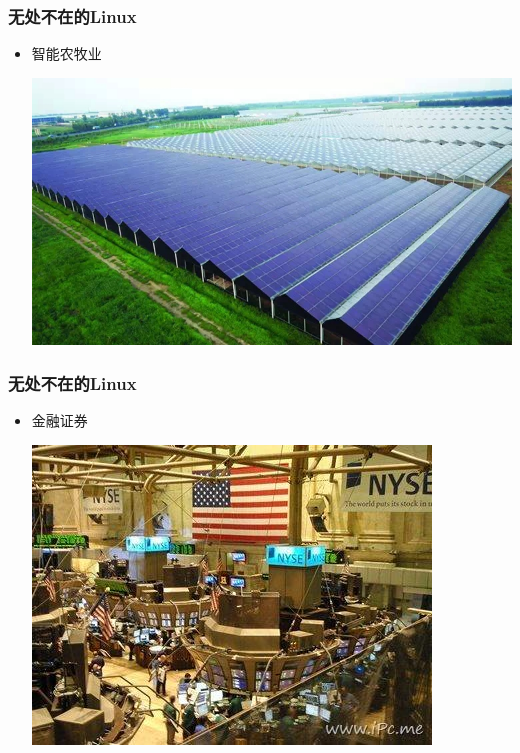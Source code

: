 \documentclass[xcolor=svgnames,bigger,presentation]{beamer}
\begin{document}
\begin{frame}
\frametitle{无处不在的Linux}
\label{sec-2-4-7}
\begin{itemize}

\item 智能农牧业
\label{sec-2-4-7-1}%
\begin{center}
\includegraphics[width=.9\linewidth]{img/nongye.jpg}
\end{center}

\end{itemize} %
\end{frame}
\begin{frame}
\frametitle{无处不在的Linux}
\label{sec-2-4-8}
\begin{itemize}

\item 金融证券
\label{sec-2-4-8-1}%
\begin{center}
\includegraphics[width=.9\linewidth]{img/jinrong.jpg}
\end{center}

\end{itemize} %
\end{frame}
\end{document}

